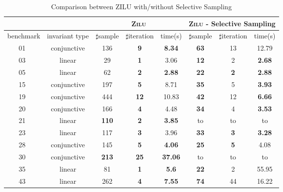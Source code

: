 \begin{table}[t]
\centering
\caption{Comparison between ZILU with/without Selective Sampling}
\begin{tabular}{l c | c c c | c c c |}
\cline{3-8}
& &\multicolumn{3}{|c|}{\textsc{Zilu}}&\multicolumn{3}{c|}{\textsc{Zilu} - Selective Sampling}\\
\hline
\multicolumn{1}{|c|}{benchmark}&\multicolumn{1}{|c|}{invariant type}& $\sharp$sample & $\sharp$iteration & time(s) & $\sharp$sample & $\sharp$iteration &time(s) \\
\hline
\multicolumn{1}{|c|}{01~\cite{isil2013inductive}}				&conjunctive	&136  	&\textbf{9}			&\textbf{8.34}		&\textbf{63}	&13			&12.79\\
\multicolumn{1}{|c|}{03~\cite{isil2013inductive}}				&linear			&29 	&\textbf{1} 		&3.06       		&\textbf{12} 	&2  		&\textbf{2.68}  \\ 
\multicolumn{1}{|c|}{05~\cite{isil2013inductive}}				&linear 		&62 	&\textbf{2} 		&\textbf{2.88} 		&\textbf{22} 	&\textbf{2}	&\textbf{2.88}  \\ 
\multicolumn{1}{|c|}{15~\cite{isil2013inductive}}				&conjunctive	&197	&\textbf{5} 		&8.71     			&\textbf{35}	&5 			&\textbf{3.93}  \\ 
\multicolumn{1}{|c|}{19~\cite{isil2013inductive}}				&conjunctive	&444	&\textbf{12}		&10.83    			&\textbf{42}	&12			&\textbf{6.66}  \\ 
\multicolumn{1}{|c|}{20~\cite{isil2013inductive}}				&conjunctive	&166	&\textbf{4} 		&4.48     			&\textbf{34}	&4 			&\textbf{3.53}  \\ 
\multicolumn{1}{|c|}{21~\cite{isil2013inductive}}				&linear			&\textbf{110}	&\textbf{2} &\textbf{3.85}     	&to				&to			&to  \\ 
\multicolumn{1}{|c|}{23~\cite{isil2013inductive}}				&linear			&117	&\textbf{3} 		&3.96     			&\textbf{33}	&\textbf{3}	&\textbf{3.28}  \\ 
\multicolumn{1}{|c|}{28~\cite{isil2013inductive}}				&conjunctive	&145	&\textbf{5} 		&\textbf{4.06}     	&\textbf{25}	&\textbf{5}	&4.08  \\ 
\multicolumn{1}{|c|}{30~\cite{isil2013inductive}}				&conjunctive	&\textbf{213}	&\textbf{25}&\textbf{37.06}		&to				&to 		&to \\ 
\multicolumn{1}{|c|}{35~\cite{isil2013inductive}}				&linear			&81 	&\textbf{1} 		&\textbf{5.6}  		&\textbf{22}	&2 			&55.95  \\ 
\multicolumn{1}{|c|}{43~\cite{isil2013inductive}}				&linear			&262	&\textbf{4} 		&\textbf{7.55}     	&\textbf{74}	&44			&16.22  \\ 

\end{tabular}
\end{table}
